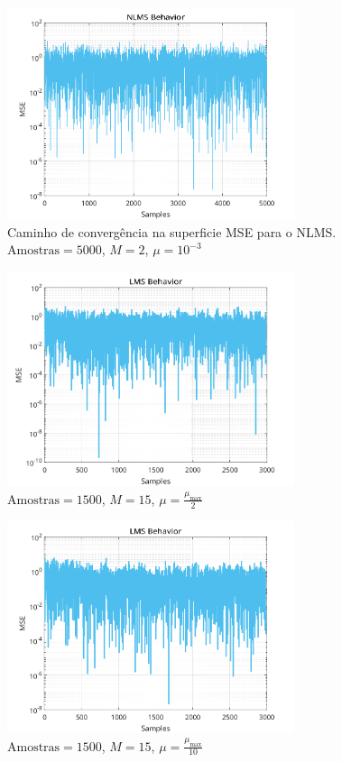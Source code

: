 \documentclass[a4paper,10pt]{article}
\begin{document}
\begin{enumerate}
				\begin{figure}[!ht]
					\centering
					\includegraphics[width=0.75\textwidth]{figs/nlms_mse.png}
					\caption{Caminho de convergência na superficie MSE para o NLMS. $\text{Amostras} = 5000$, $M = 2$, $\mu = 10^{-3}$}
					\label{fig:nlms_mse}
				\end{figure}

				\begin{figure}[!ht]
					\centering
					\includegraphics[width=0.75\textwidth]{figs/L3Q5_mu_2.png}
					\caption{$\text{Amostras} = 1500$, $M = 15$, $\mu = \frac{\mu_{\text{max}}}{2}$}
					\label{fig:mu_2}
				\end{figure}

				\begin{figure}[!ht]
					\centering
					\includegraphics[width=0.75\textwidth]{figs/L3Q5_mu_10.png}
					\caption{$\text{Amostras} = 1500$, $M = 15$, $\mu = \frac{\mu_{\text{max}}}{10}$}
					\label{fig:mu_10}
				\end{figure}


\end{enumerate}
\end{document}
